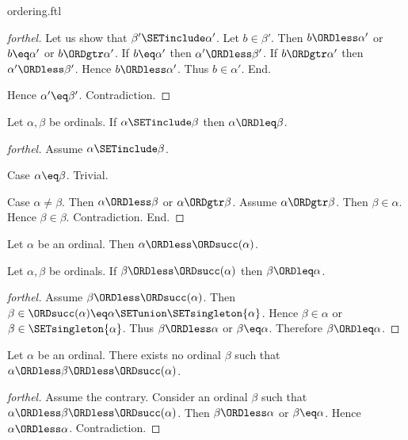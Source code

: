 \documentclass{naproche-library}
\begin{document}
\begin{smodule}[title=The Standard Ordering of the Ordinals]{ordering.ftl}
\begin{proof}[forthel]
  Let us show that $\beta' \SETinclude \alpha'$.
    Let $b \in \beta'$.
    Then $b \ORDless \alpha'$ or $b \eq \alpha'$ or $b \ORDgtr \alpha'$.
    If $b \eq \alpha'$ then $\alpha' \ORDless \beta'$.
    If $b \ORDgtr \alpha'$ then $\alpha' \ORDless \beta'$.
    Hence $b \ORDless \alpha'$.
    Thus $b \in \alpha'$.
  End.

  Hence $\alpha' \eq \beta'$.
  Contradiction.
\end{proof}

\begin{proposition}[forthel,id=SET_THEORY_02_610496856195072]
  Let $\alpha, \beta$ be ordinals.
  If $\alpha \SETinclude \beta$ then $\alpha \ORDleq \beta$.
\end{proposition}
\begin{proof}[forthel]
  Assume $\alpha \SETinclude \beta$.

  Case $\alpha \eq \beta$. Trivial.

  Case $\alpha \neq \beta$.
    Then $\alpha \ORDless \beta$ or $\alpha \ORDgtr \beta$.
    Assume $\alpha \ORDgtr \beta$.
    Then $\beta \in \alpha$.
    Hence $\beta \in \beta$.
    Contradiction.
  End.
\end{proof}

\begin{proposition}[forthel,id=SET_THEORY_02_5689190964527104]
  Let $\alpha$ be an ordinal.
  Then $\alpha \ORDless \ORDsucc(\alpha)$.
\end{proposition}

\begin{proposition}[forthel,id=SET_THEORY_02_4064972025888768]
  Let $\alpha, \beta$ be ordinals.
  If $\beta \ORDless \ORDsucc(\alpha)$ then $\beta \ORDleq \alpha$.
\end{proposition}
\begin{proof}[forthel]
  Assume $\beta \ORDless \ORDsucc(\alpha)$.
  Then $\beta \in \ORDsucc(\alpha) \eq \alpha \SETunion \SETsingleton{\alpha}$.
  Hence $\beta \in \alpha$ or $\beta \in \SETsingleton{\alpha}$.
  Thus $\beta \ORDless \alpha$ or $\beta \eq \alpha$.
  Therefore $\beta \ORDleq \alpha$.
\end{proof}

\begin{proposition}[forthel,id=SET_THEORY_02_8242798790705152]
  Let $\alpha$ be an ordinal.
  There exists no ordinal $\beta$ such that $\alpha \ORDless \beta \ORDless \ORDsucc(\alpha)$.
\end{proposition}
\begin{proof}[forthel]
  Assume the contrary.
  Consider an ordinal $\beta$ such that $\alpha \ORDless \beta \ORDless \ORDsucc(\alpha)$.
  Then $\beta \ORDless \alpha$ or $\beta \eq \alpha$.
  Hence $\alpha \ORDless \alpha$.
  Contradiction.
\end{proof}


\end{smodule}
\end{document}
